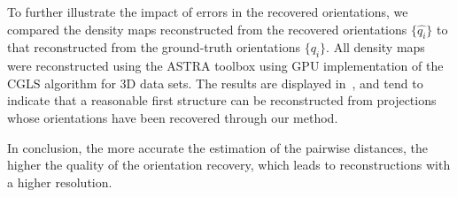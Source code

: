 To further illustrate the impact of errors in the recovered orientations, we compared the density maps reconstructed from the recovered orientations $\{ \widehat{q_i} \}$ to that reconstructed from the ground-truth orientations $\{ q_i \}$. All density maps were reconstructed using the ASTRA toolbox using GPU implementation of the CGLS algorithm for 3D data sets. 
The results are displayed in~, and tend to indicate that a reasonable first structure can be reconstructed from projections whose orientations have been recovered through our method. 

In conclusion, the more accurate the estimation of the pairwise distances, the higher the quality of the orientation recovery, which leads to reconstructions with a higher resolution. %

